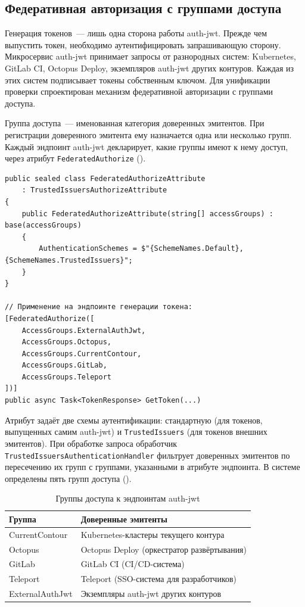 \subsection{Федеративная авторизация с группами доступа}\label{subsec:federated-auth}

Генерация токенов~--- лишь одна сторона работы auth-jwt.
Прежде чем выпустить токен, необходимо аутентифицировать запрашивающую сторону.
Микросервис auth-jwt принимает запросы от разнородных систем:
Kubernetes, GitLab CI, Octopus Deploy,
экземпляров auth-jwt других контуров.
Каждая из этих систем подписывает токены собственным ключом.
Для унификации проверки спроектирован механизм
федеративной авторизации с группами доступа.

Группа доступа~--- именованная категория доверенных эмитентов.
При регистрации доверенного эмитента ему назначается одна или несколько групп.
Каждый эндпоинт auth-jwt декларирует, какие группы имеют к нему доступ,
через атрибут \texttt{FederatedAuthorize} ().

\begin{lstlisting}[language={[Sharp]C}]
public sealed class FederatedAuthorizeAttribute
    : TrustedIssuersAuthorizeAttribute
{
    public FederatedAuthorizeAttribute(string[] accessGroups) : base(accessGroups)
    {
        AuthenticationSchemes = $"{SchemeNames.Default},{SchemeNames.TrustedIssuers}";
    }
}

// Применение на эндпоинте генерации токена:
[FederatedAuthorize([
    AccessGroups.ExternalAuthJwt,
    AccessGroups.Octopus,
    AccessGroups.CurrentContour,
    AccessGroups.GitLab,
    AccessGroups.Teleport
])]
public async Task<TokenResponse> GetToken(...)
\end{lstlisting}

Атрибут задаёт две схемы аутентификации:
стандартную (для токенов, выпущенных самим auth-jwt)
и \texttt{TrustedIssuers} (для токенов внешних эмитентов).
При обработке запроса обработчик \texttt{TrustedIssuersAuthenticationHandler}
фильтрует доверенных эмитентов по пересечению их групп
с группами, указанными в атрибуте эндпоинта.
В системе определены пять групп доступа ().

\begin{table}[h]
  \centering
  \caption{Группы доступа к эндпоинтам auth-jwt}
  \label{tab:access-groups}
  \begin{tabularx}{\textwidth}{l X}
    \hline
    \textbf{Группа} & \textbf{Доверенные эмитенты} \\
    \hline
    CurrentContour   & Kubernetes-кластеры текущего контура \\
    Octopus          & Octopus Deploy (оркестратор развёртывания) \\
    GitLab           & GitLab CI (CI/CD-система) \\
    Teleport         & Teleport (SSO-система для разработчиков) \\
    ExternalAuthJwt  & Экземпляры auth-jwt других контуров \\
    \hline
  \end{tabularx}
\end{table}

